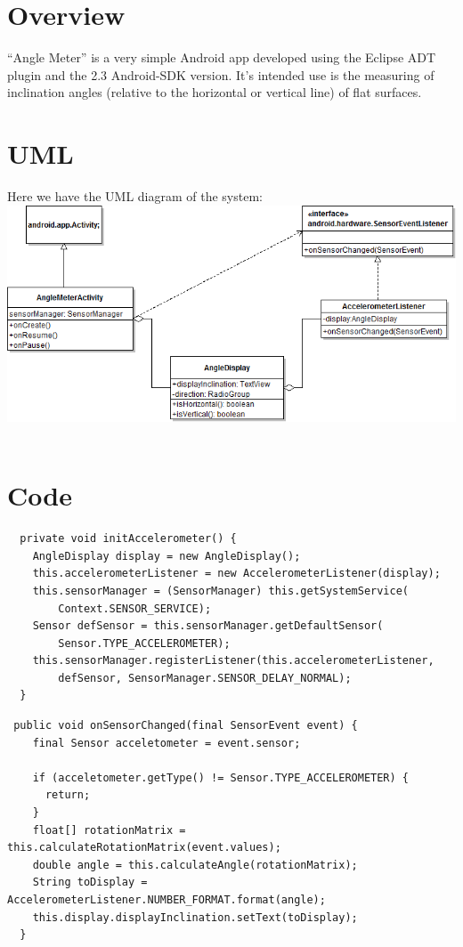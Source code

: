 \section{Overview}
``Angle Meter'' is a very simple Android app developed using the Eclipse ADT plugin and the 2.3 Android-SDK version.
It's intended use is the measuring of inclination angles (relative to the horizontal or vertical line) of flat surfaces.

\section{UML}
Here we have the UML diagram of the system:
\\
\includegraphics[scale=0.5]{images/UML.png} \\
\\

\section{Code}

\lstset{language=Java, caption=Initialization of the sensor and attaching the listener; lori.sma.AngleMeterActivity,
label=onChange}
\begin{lstlisting}
  private void initAccelerometer() {
    AngleDisplay display = new AngleDisplay();
    this.accelerometerListener = new AccelerometerListener(display);
    this.sensorManager = (SensorManager) this.getSystemService(
        Context.SENSOR_SERVICE);
    Sensor defSensor = this.sensorManager.getDefaultSensor(
        Sensor.TYPE_ACCELEROMETER);
    this.sensorManager.registerListener(this.accelerometerListener, 
        defSensor, SensorManager.SENSOR_DELAY_NORMAL);
  }
\end{lstlisting}


\lstset{language=Java, caption=The brains of the app from lori.sma.AccelerometerListener, label=onChange}
\begin{lstlisting}
 public void onSensorChanged(final SensorEvent event) {
    final Sensor acceletometer = event.sensor;

    if (acceletometer.getType() != Sensor.TYPE_ACCELEROMETER) {
      return;
    }
    float[] rotationMatrix = this.calculateRotationMatrix(event.values);
    double angle = this.calculateAngle(rotationMatrix);
    String toDisplay = AccelerometerListener.NUMBER_FORMAT.format(angle);
    this.display.displayInclination.setText(toDisplay);
  }
\end{lstlisting}

